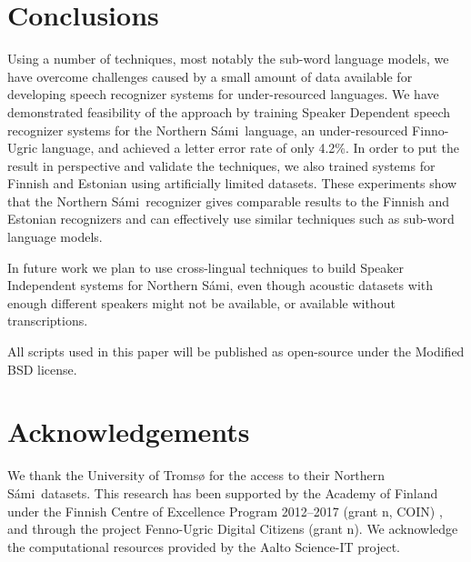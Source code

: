 \documentclass[b5paper]{article}
\newcommand{\note}[1]{{\textcolor{blue}{#1}}}
\newcommand{\ns}{Northern Sámi}
\begin{document}
\section{Conclusions} 
Using a number of techniques, most notably the sub-word language models, we have overcome challenges caused by a small amount of data available for developing speech recognizer systems for under-resourced languages. We have demonstrated feasibility of the approach by training Speaker Dependent speech recognizer systems for the \ns\ language, an under-resourced Finno-Ugric language, and achieved a letter error rate of only 4.2\%. 
In order to put the result in perspective and validate the techniques, we also trained systems
 for Finnish and Estonian using artificially limited datasets. These experiments show that the \ns\ recognizer gives comparable results to the Finnish and Estonian recognizers and can effectively use  similar techniques such as sub-word language models.

In future work we plan to use cross-lingual techniques to build Speaker Independent systems for \ns, even though acoustic datasets with enough different speakers might not be available, or available without transcriptions.

All scripts used in this paper will be published as open-source under the Modified BSD license. 





\section{Acknowledgements} 
We thank the University of Tromsø for the access to their \ns\ datasets.  This research has been supported by the Academy of Finland under the Finnish Centre of Excellence Program 2012--2017 (grant n, COIN) , and through the project Fenno-Ugric Digital Citizens (grant n).
We acknowledge the computational resources provided by the Aalto Science-IT project. 




 
\end{document}
